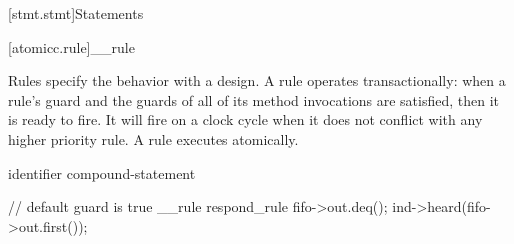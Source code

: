 [stmt.stmt]{Statements}%


[atomicc.rule]{__rule}

Rules specify the behavior with a design. A rule operates
transactionally: when a rule's guard and the guards of all of its
method invocations are satisfied, then it is ready to fire. It will
fire on a clock cycle when it does not conflict with any higher
priority rule. A rule executes atomically.

\begin{bnf}
\br
     identifier  compound-statement\br

\end{bnf}

\begin{example}
\begin{codeblock}
     // default guard is true
     __rule respond_rule {
         fifo->out.deq();
         ind->heard(fifo->out.first());
     }
\end{codeblock}
\end{example}
